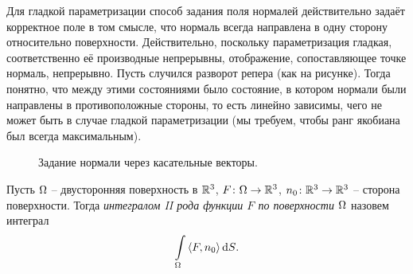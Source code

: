 \begin{remark}
    Для гладкой параметризации способ задания поля нормалей действительно задаёт корректное
    поле в том смысле, что нормаль всегда направлена в одну сторону относительно поверхности.
    Действительно, поскольку параметризация гладкая, соответственно её производные непрерывны,
    отображение, сопоставляющее точке нормаль, непрерывно. Пусть случился разворот репера (как
    на рисунке). Тогда понятно, что между этими состояниями было состояние, в котором
    нормали были направлены в противоположные стороны, то есть линейно зависимы, чего не может
    быть в случае гладкой параметризации (мы требуем, чтобы ранг якобиана был всегда максимальным).
\end{remark}

\begin{figure}[ht]
    \centering
    \caption{Задание нормали через касательные векторы.}
\end{figure}

\begin{definition}
    Пусть $\Omega$ -- двусторонняя поверхность в $\mathbb{R}^3$, $F \colon \Omega \to \mathbb{R}^3$, 
    $n_0 \colon \mathbb{R}^3 \to \mathbb{R}^3$ -- сторона поверхности. Тогда \textit{
    интегралом II рода функции $F$ по поверхности $\Omega$} назовем интеграл
\[
    \int\limits_{\Omega}{\langle F, n_0 \rangle \,\mathrm{d} S}
.\] 
\end{definition}

